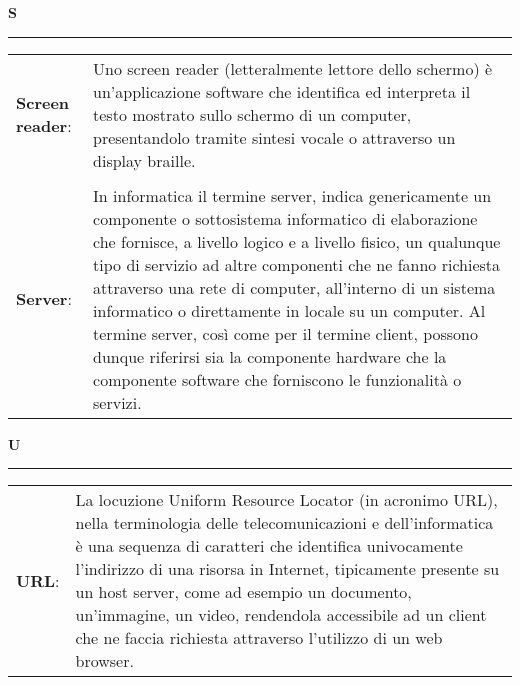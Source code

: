 	\hfill\Huge{\textbf{S}}\\
\rule{16cm}{.6pt}
\normalsize
	\begin{longtable}{p{} p{}} 
	    \\
		    \textbf{Screen reader}: & Uno screen reader (letteralmente lettore dello schermo) è un'applicazione software che identifica ed interpreta il testo mostrato sullo schermo di un computer, presentandolo tramite sintesi vocale o attraverso un display braille.\\
		    \\
		    \textbf{Server}: & In informatica il termine server, indica genericamente un componente o sottosistema informatico di elaborazione che fornisce, a livello logico e a livello fisico, un qualunque tipo di servizio ad altre componenti che ne fanno richiesta attraverso una rete di computer, all'interno di un sistema informatico o direttamente in locale su un computer. Al termine server, così come per il termine client, possono dunque riferirsi sia la componente hardware che la componente software che forniscono le funzionalità o servizi.\\
	\end{longtable}
	
\hfill\Huge{\textbf{U}}\\
\rule{16cm}{.6pt}
\normalsize
	\begin{longtable}{p{} p{}} 
	    \\
		    \textbf{URL}: & La locuzione Uniform Resource Locator (in acronimo URL), nella terminologia delle telecomunicazioni e dell'informatica è una sequenza di caratteri che identifica univocamente l'indirizzo di una risorsa in Internet, tipicamente presente su un host server, come ad esempio un documento, un'immagine, un video, rendendola accessibile ad un client che ne faccia richiesta attraverso l'utilizzo di un web browser.\\
	\end{longtable}
	
	
	
	
	
	
	
	
	
	
	
	
	
	

